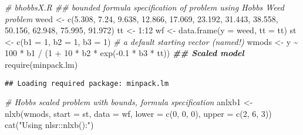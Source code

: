 \documentclass[
]{article}
\newenvironment{Shaded}{\begin{snugshade}}{\end{snugshade}}
\newcommand{\AttributeTok}[1]{\textcolor[rgb]{0.77,0.63,0.00}{#1}}
\newcommand{\CommentTok}[1]{\textcolor[rgb]{0.56,0.35,0.01}{\textit{#1}}}
\newcommand{\DecValTok}[1]{\textcolor[rgb]{0.00,0.00,0.81}{#1}}
\newcommand{\DocumentationTok}[1]{\textcolor[rgb]{0.56,0.35,0.01}{\textbf{\textit{#1}}}}
\newcommand{\FloatTok}[1]{\textcolor[rgb]{0.00,0.00,0.81}{#1}}
\newcommand{\FunctionTok}[1]{\textcolor[rgb]{0.00,0.00,0.00}{#1}}
\newcommand{\NormalTok}[1]{#1}
\newcommand{\OtherTok}[1]{\textcolor[rgb]{0.56,0.35,0.01}{#1}}
\newcommand{\SpecialCharTok}[1]{\textcolor[rgb]{0.00,0.00,0.00}{#1}}
\newcommand{\StringTok}[1]{\textcolor[rgb]{0.31,0.60,0.02}{#1}}
\begin{document}
\begin{Shaded}
\begin{Highlighting}[]
\CommentTok{\# bhobbsX.R \#\# bounded formula specification of problem using Hobbs Weed problem}
\NormalTok{weed }\OtherTok{\textless{}{-}} \FunctionTok{c}\NormalTok{(}\FloatTok{5.308}\NormalTok{, }\FloatTok{7.24}\NormalTok{, }\FloatTok{9.638}\NormalTok{, }\FloatTok{12.866}\NormalTok{, }\FloatTok{17.069}\NormalTok{, }\FloatTok{23.192}\NormalTok{, }\FloatTok{31.443}\NormalTok{,}
          \FloatTok{38.558}\NormalTok{, }\FloatTok{50.156}\NormalTok{, }\FloatTok{62.948}\NormalTok{, }\FloatTok{75.995}\NormalTok{, }\FloatTok{91.972}\NormalTok{)}
\NormalTok{tt }\OtherTok{\textless{}{-}} \DecValTok{1}\SpecialCharTok{:}\DecValTok{12}
\NormalTok{wf }\OtherTok{\textless{}{-}} \FunctionTok{data.frame}\NormalTok{(}\AttributeTok{y =}\NormalTok{ weed, }\AttributeTok{tt =}\NormalTok{ tt)}
\NormalTok{st }\OtherTok{\textless{}{-}} \FunctionTok{c}\NormalTok{(}\AttributeTok{b1 =} \DecValTok{1}\NormalTok{, }\AttributeTok{b2 =} \DecValTok{1}\NormalTok{, }\AttributeTok{b3 =} \DecValTok{1}\NormalTok{) }\CommentTok{\# a default starting vector (named!)}
\NormalTok{wmods }\OtherTok{\textless{}{-}}\NormalTok{ y }\SpecialCharTok{\textasciitilde{}} \DecValTok{100} \SpecialCharTok{*}\NormalTok{ b1 }\SpecialCharTok{/}\NormalTok{ (}\DecValTok{1} \SpecialCharTok{+} \DecValTok{10} \SpecialCharTok{*}\NormalTok{ b2 }\SpecialCharTok{*} \FunctionTok{exp}\NormalTok{(}\SpecialCharTok{{-}}\FloatTok{0.1} \SpecialCharTok{*}\NormalTok{ b3 }\SpecialCharTok{*}\NormalTok{ tt)) }\DocumentationTok{\#\# Scaled model}
\FunctionTok{require}\NormalTok{(minpack.lm)}
\end{Highlighting}
\end{Shaded}

\begin{verbatim}
## Loading required package: minpack.lm
\end{verbatim}

\begin{Shaded}
\begin{Highlighting}[]
\CommentTok{\# Hobbs scaled problem with bounds, formula specification}
\NormalTok{anlxb1 }\OtherTok{\textless{}{-}} \FunctionTok{nlxb}\NormalTok{(wmods, }\AttributeTok{start =}\NormalTok{ st, }\AttributeTok{data =}\NormalTok{ wf, }\AttributeTok{lower =} \FunctionTok{c}\NormalTok{(}\DecValTok{0}\NormalTok{, }\DecValTok{0}\NormalTok{, }\DecValTok{0}\NormalTok{), }\AttributeTok{upper =} \FunctionTok{c}\NormalTok{(}\DecValTok{2}\NormalTok{, }\DecValTok{6}\NormalTok{, }\DecValTok{3}\NormalTok{))}
\FunctionTok{cat}\NormalTok{(}\StringTok{"Using nlsr::nlxb():"}\NormalTok{)}
\end{Highlighting}
\end{Shaded}
\end{document}
